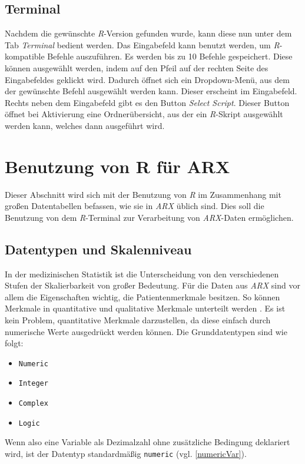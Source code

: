 \documentclass[a4paper, 12pt]{report} %
\begin{document}
\subsection{Terminal} \label{Terminal}
Nachdem die gewünschte \textit{R}-Version gefunden wurde, kann diese nun unter dem Tab \textit{Terminal} bedient werden. Das Eingabefeld kann benutzt werden, um \textit{R}-kompatible Befehle auszuführen. Es werden bis zu 10 Befehle gespeichert. Diese können ausgewählt werden, indem auf den Pfeil auf der rechten Seite des Eingabefeldes geklickt wird. Dadurch öffnet sich ein Dropdown-Menü, aus dem der gewünschte Befehl ausgewählt werden kann. Dieser erscheint im Eingabefeld. Rechts neben dem Eingabefeld gibt es den Button \textit{Select Script}. Dieser Button öffnet bei Aktivierung eine Ordnerübersicht, aus der ein \textit{R}-Skript ausgewählt werden kann, welches dann ausgeführt wird. 


\section{Benutzung von R für ARX } \label{NutzungArx}
Dieser Abschnitt wird sich mit der Benutzung von \textit{R} im Zusammenhang mit großen Datentabellen befassen, wie sie in \textit{ARX} üblich sind. Dies soll die Benutzung von dem \textit{R}-Terminal zur Verarbeitung von \textit{ARX}-Daten ermöglichen. 


\subsection{Datentypen und Skalenniveau}\label{Skalen}
In der medizinischen Statistik ist die Unterscheidung von den verschiedenen Stufen der Skalierbarkeit von großer Bedeutung. Für die Daten aus \textit{ARX} sind vor allem die Eigenschaften wichtig, die Patientenmerkmale besitzen. So können Merkmale in quantitative und qualitative Merkmale unterteilt werden \cite{skalenniveau}. Es ist kein Problem, quantitative Merkmale darzustellen, da diese einfach durch numerische Werte ausgedrückt werden können. Die Grunddatentypen sind wie folgt:

\begin{itemize}
\item \texttt{Numeric}
\item \texttt{Integer}
\item \texttt{Complex}
\item \texttt{Logic}
\end{itemize}

Wenn also eine Variable als Dezimalzahl ohne zusätzliche Bedingung deklariert wird, ist der Datentyp standardmäßig \texttt{numeric} (vgl. \ref{numericVar}).
\end{document}
